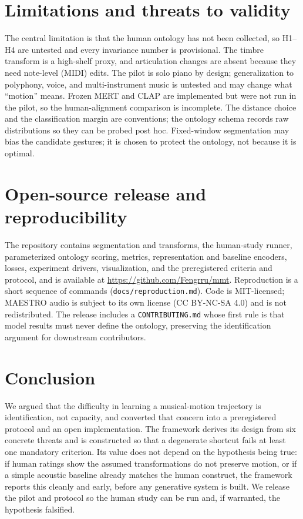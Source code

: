 \documentclass[11pt]{article}
\begin{document}
\section{Limitations and threats to validity}
The central limitation is that the human ontology has not been collected, so
H1--H4 are untested and every invariance number is provisional. The timbre
transform is a high-shelf proxy, and articulation changes are absent because they
need note-level (MIDI) edits. The pilot is solo piano by design; generalization to
polyphony, voice, and multi-instrument music is untested and may change what
``motion'' means. Frozen MERT and CLAP are implemented but were not run in the
pilot, so the human-alignment comparison is incomplete. The distance choice and
the classification margin are conventions; the ontology schema records raw
distributions so they can be probed post hoc. Fixed-window segmentation may bias
the candidate gestures; it is chosen to protect the ontology, not because it is
optimal.

\section{Open-source release and reproducibility}
\label{sec:release}
The repository contains segmentation and transforms, the human-study runner,
parameterized ontology scoring, metrics, representation and baseline encoders,
losses, experiment drivers, visualization, and the preregistered criteria and
protocol, and is available at \url{https://github.com/Fengrru/mmt}.
Reproduction is a short sequence of commands
(\texttt{docs/reproduction.md}). Code is MIT-licensed; MAESTRO audio is subject to
its own license (CC BY-NC-SA 4.0) and is not redistributed. The release includes a
\texttt{CONTRIBUTING.md} whose first rule is that model results must never define
the ontology, preserving the identification argument for downstream contributors.

\section{Conclusion}
We argued that the difficulty in learning a musical-motion trajectory is
identification, not capacity, and converted that concern into a preregistered
protocol and an open implementation. The framework derives its design from six
concrete threats and is constructed so that a degenerate shortcut fails at least
one mandatory criterion. Its value does not depend on the hypothesis being true:
if human ratings show the assumed transformations do not preserve motion, or if a
simple acoustic baseline already matches the human construct, the framework
reports this cleanly and early, before any generative system is built. We release
the pilot and protocol so the human study can be run and, if warranted, the
hypothesis falsified.
\end{document}
